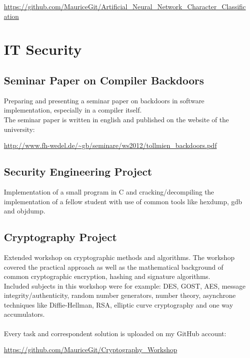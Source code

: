 \documentclass[a4paper, 12pt]{article}
\begin{document}
\begin{center}
	\url{https://github.com/MauriceGit/Artificial_Neural_Network_Character_Classification}
\end{center}

\section{IT Security}

\subsection{Seminar Paper on Compiler Backdoors}

Preparing and presenting a seminar paper on backdoors in software implementation, especially in 
a compiler itself.
\\
The seminar paper is written in english and published on the website of the university:

\begin{center}
	\url{http://www.fh-wedel.de/~gb/seminare/ws2012/tollmien_backdoors.pdf}
\end{center}

\subsection{Security Engineering Project}

Implementation of a small program in C and cracking/decompiling the implementation of a fellow student with use
of common tools like hexdump, gdb and objdump.

\subsection{Cryptography Project}

Extended workshop on cryptographic methods and algorithms. The workshop covered the practical approach as well as
the mathematical background of common cryptographic encryption, hashing and signature algorithms.
\\
Included subjects in this workshop were for example: DES, GOST, AES, message integrity/authenticity, random number
generators, number theory, asynchrone techniques like Diffie-Hellman, RSA, elliptic curve cryptography and one way
accumulators.
\\
\\
Every task and correspondent solution is uploaded on my GitHub account:

\begin{center}
	\url{https://github.com/MauriceGit/Cryptography_Workshop}
\end{center}
\end{document}
